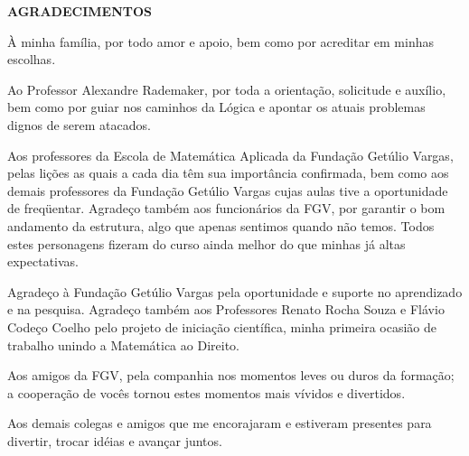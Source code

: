 \documentclass[12pt, a4paper, twoside]{article}
\theoremstyle{definition}
\begin{document}
\begin{center}
	\textbf{AGRADECIMENTOS}
\end{center}


À minha família, por todo amor e apoio, bem como por acreditar em minhas escolhas.

Ao Professor Alexandre Rademaker, por toda a orientação, solicitude e auxílio, bem como por guiar nos caminhos da Lógica e apontar os atuais problemas dignos de serem atacados.

Aos professores da Escola de Matemática Aplicada da Fundação Getúlio Vargas, pelas lições as quais a cada dia têm sua importância confirmada, bem como aos demais professores da Fundação Getúlio Vargas cujas aulas tive a oportunidade de freqüentar. Agradeço também aos funcionários da FGV, por garantir o bom andamento da estrutura, algo que apenas sentimos quando não temos. Todos estes personagens fizeram do curso ainda melhor do que minhas já altas expectativas.

Agradeço à Fundação Getúlio Vargas pela oportunidade e suporte no aprendizado e na pesquisa. Agradeço também aos Professores Renato Rocha Souza e Flávio Codeço Coelho pelo projeto de iniciação científica, minha primeira ocasião de trabalho unindo a Matemática ao Direito.

Aos amigos da FGV, pela companhia nos momentos leves ou duros da formação; a cooperação de vocês tornou estes momentos mais vívidos e divertidos.

Aos demais colegas e amigos que me encorajaram e estiveram presentes para divertir, trocar idéias e avançar juntos.
\clearpage

\newpage
\thispagestyle{empty}

\vfill
\vspace*{0.7\textheight}
\begin{flushright}


	\textsl{}

	
\end{flushright}
\end{document}
